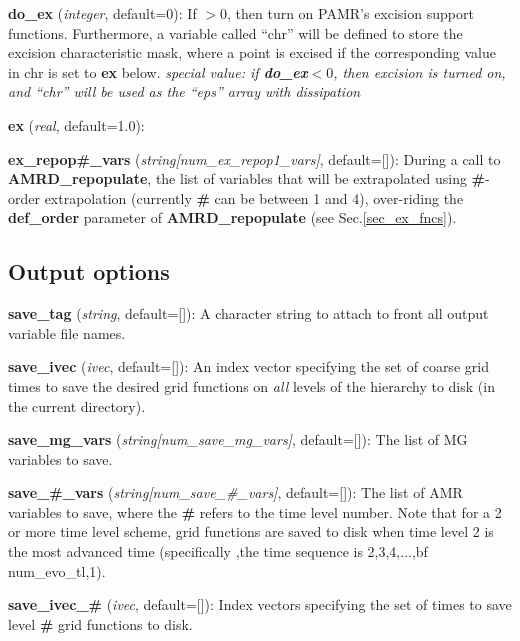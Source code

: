\documentclass[aps,amssymb,unsortedaddress,nofootinbib]{revtex4}
\def\lsep{\itemsep 0.05in}
\begin{document}
\begin{list}{}{\lsep}
\item {\bf do\_ex} ({\em integer}, default=0): If $>0$, then turn on PAMR's excision
      support functions. Furthermore, a variable called ``chr'' will be defined
      to store the excision characteristic mask, where a point is excised 
      if the corresponding value in chr is set to {\bf ex} below.
      {\em special value: if {\bf do\_ex}$<0$, then excision is turned
      on, and ``chr'' will be used as the ``eps'' array with dissipation}
\item {\bf ex} ({\em real}, default=1.0):
\item {\bf ex\_repop\#\_vars} ({\em string[num\_ex\_repop1\_vars]}, default=[]):
      During a call to {\bf AMRD\_repopulate}, the list of variables
      that will be extrapolated using {\bf \#}-order extrapolation (currently
      {\bf \#} can be between 1 and 4), over-riding the {\bf def\_order} parameter
      of {\bf AMRD\_repopulate} (see Sec.\ref{sec_ex_fncs}).
\end{list}

\subsection{Output options}

\begin{list}{}{\lsep}
\item {\bf save\_tag} ({\em string}, default=[]): A character string to attach
      to front all output variable file names.
\item {\bf save\_ivec} ({\em ivec}, default=[]): An index vector specifying
      the set of coarse grid times to save the desired grid functions on
      {\em all} levels of the hierarchy to disk (in the current directory).
\item {\bf save\_mg\_vars} ({\em string[num\_save\_mg\_vars]}, default=[]):
      The list of MG variables to save.
\item {\bf save\_\#\_vars} ({\em string[num\_save\_\#\_vars]}, default=[]):
      The list of AMR variables to save, where the {\bf \#} refers
      to the time level number. Note that for a 2 or more time level scheme,
      grid functions are saved to disk when time level 2 is the most advanced
      time (specifically ,the time sequence is 2,3,4,...,{bf num\_evo\_tl},1).
\item {\bf save\_ivec\_\#} ({\em ivec}, default=[]): Index vectors specifying
      the set of times to save level {\bf \#} grid functions to disk.
\end{list}
\end{document}
